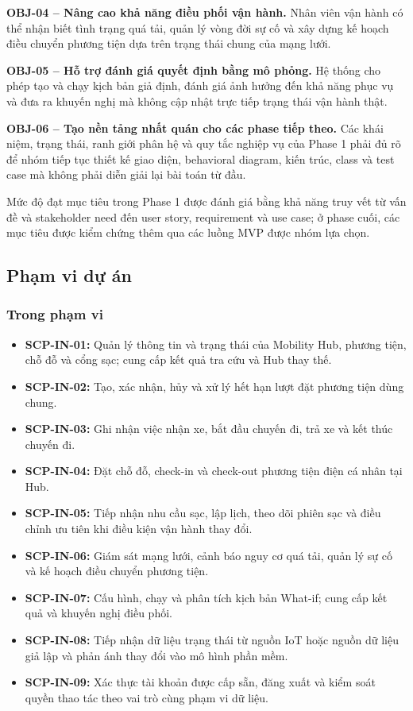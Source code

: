 \medskip
\noindent\textbf{OBJ-04 -- Nâng cao khả năng điều phối vận hành.}
Nhân viên vận hành có thể nhận biết tình trạng quá tải, quản lý vòng đời sự cố và xây dựng kế hoạch điều chuyển phương tiện dựa trên trạng thái chung của mạng lưới.

\medskip
\noindent\textbf{OBJ-05 -- Hỗ trợ đánh giá quyết định bằng mô phỏng.}
Hệ thống cho phép tạo và chạy kịch bản giả định, đánh giá ảnh hưởng đến khả năng phục vụ và đưa ra khuyến nghị mà không cập nhật trực tiếp trạng thái vận hành thật.

\medskip
\noindent\textbf{OBJ-06 -- Tạo nền tảng nhất quán cho các phase tiếp theo.}
Các khái niệm, trạng thái, ranh giới phân hệ và quy tắc nghiệp vụ của Phase 1 phải đủ rõ để nhóm tiếp tục thiết kế giao diện, behavioral diagram, kiến trúc, class và test case mà không phải diễn giải lại bài toán từ đầu.

Mức độ đạt mục tiêu trong Phase 1 được đánh giá bằng khả năng truy vết từ vấn đề và stakeholder need đến user story, requirement và use case; ở phase cuối, các mục tiêu được kiểm chứng thêm qua các luồng MVP được nhóm lựa chọn.

\subsection{Phạm vi dự án}

\subsubsection*{Trong phạm vi}

\begin{itemize}
  \item \textbf{SCP-IN-01:} Quản lý thông tin và trạng thái của Mobility Hub, phương tiện, chỗ đỗ và cổng sạc; cung cấp kết quả tra cứu và Hub thay thế.
  \item \textbf{SCP-IN-02:} Tạo, xác nhận, hủy và xử lý hết hạn lượt đặt phương tiện dùng chung.
  \item \textbf{SCP-IN-03:} Ghi nhận việc nhận xe, bắt đầu chuyến đi, trả xe và kết thúc chuyến đi.
  \item \textbf{SCP-IN-04:} Đặt chỗ đỗ, check-in và check-out phương tiện điện cá nhân tại Hub.
  \item \textbf{SCP-IN-05:} Tiếp nhận nhu cầu sạc, lập lịch, theo dõi phiên sạc và điều chỉnh ưu tiên khi điều kiện vận hành thay đổi.
  \item \textbf{SCP-IN-06:} Giám sát mạng lưới, cảnh báo nguy cơ quá tải, quản lý sự cố và kế hoạch điều chuyển phương tiện.
  \item \textbf{SCP-IN-07:} Cấu hình, chạy và phân tích kịch bản What-if; cung cấp kết quả và khuyến nghị điều phối.
  \item \textbf{SCP-IN-08:} Tiếp nhận dữ liệu trạng thái từ nguồn IoT hoặc nguồn dữ liệu giả lập và phản ánh thay đổi vào mô hình phần mềm.
  \item \textbf{SCP-IN-09:} Xác thực tài khoản được cấp sẵn, đăng xuất và kiểm soát quyền thao tác theo vai trò cùng phạm vi dữ liệu.
\end{itemize}

